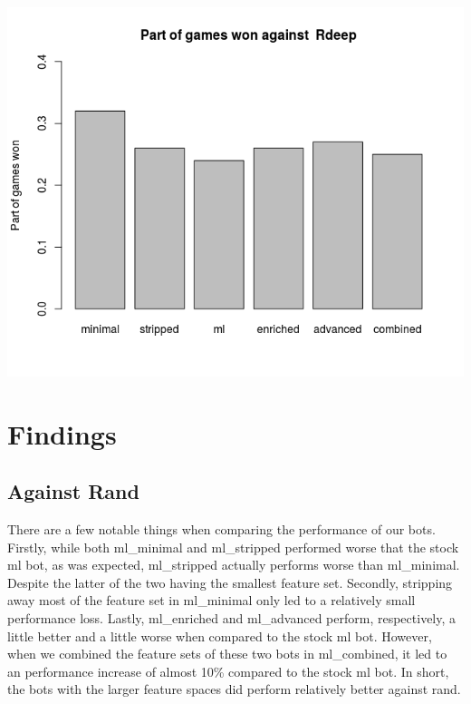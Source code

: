 \documentclass[a4paper,11pt]{article}
\begin{document}
\begin{center}
\begin{minipage}{0.49\linewidth}
\end{minipage}
      \\ %
\begin{minipage}{0.49\linewidth}
\includegraphics[width=\linewidth]{images/barplotRdeep.png}
\end{minipage}
\end{center}

\section{Findings}

\subsection*{Against Rand}
There are a few notable things when comparing the performance of our bots. Firstly, while both ml\_minimal and ml\_stripped performed worse that the stock ml bot, as was expected, ml\_stripped actually performs worse than ml\_minimal. Despite the latter of the two having the smallest feature set. Secondly, stripping away most of the feature set in ml\_minimal only led to a relatively small performance loss. Lastly, ml\_enriched and ml\_advanced perform, respectively, a little better and a little worse when compared to the stock ml bot. However, when we combined the feature sets of these two bots in ml\_combined, it led to an performance increase of almost 10\% compared to the stock ml bot. In short, the bots with the larger feature spaces did perform relatively better against rand.
\end{document}
